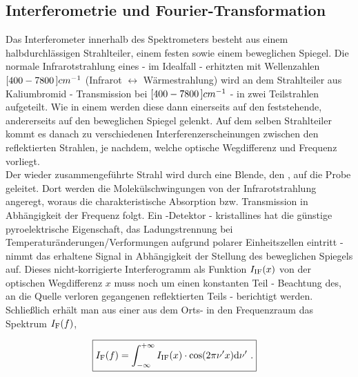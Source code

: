 \subsection{Interferometrie und Fourier-Transformation}

Das Interferometer innerhalb des Spektrometers besteht aus einem halbdurchl\"assigen Strahlteiler, einem festen sowie einem beweglichen Spiegel. Die normale Infrarotstrahlung eines - im Idealfall - erhitzten  mit Wellenzahlen $\unit[[400-7800]]{cm^{-1}}$ (Infrarot $\leftrightarrow$ W\"armestrahlung) wird an dem Strahlteiler aus Kaliumbromid - Transmission bei $\unit[[400-7800]]{cm^{-1}}$ - in zwei Teilstrahlen aufgeteilt. Wie in einem  werden diese dann einerseits auf den feststehende, andererseits auf den beweglichen Spiegel gelenkt. Auf dem selben Strahlteiler kommt es danach zu verschiedenen Interferenzerscheinungen zwischen den reflektierten Strahlen, je nachdem, welche optische Wegdifferenz und Frequenz vorliegt.\\
Der wieder zusammengef\"uhrte Strahl wird durch eine Blende, den , auf die Probe geleitet. Dort werden die Molek\"ulschwingungen von der Infrarotstrahlung angeregt, woraus die charakteristische Absorption bzw. Transmission in Abh\"angigkeit der Frequenz folgt. Ein -Detektor - kristallines  hat die g\"unstige pyroelektrische Eigenschaft, das Ladungstrennung bei Temperatur\"anderungen/Verformungen aufgrund polarer Einheitszellen eintritt - nimmt das erhaltene Signal in Abh\"angigkeit der Stellung des beweglichen Spiegels auf. Dieses nicht-korrigierte Interferogramm als Funktion $I_\text{IF}(x)$ von der optischen Wegdifferenz $x$ muss noch um einen konstanten Teil - Beachtung des, an die Quelle verloren gegangenen reflektierten Teils - berichtigt werden. Schlie{\ss}lich erh\"alt man aus einer   aus dem Orts- in den Frequenzraum das Spektrum $I_\text{F}(f)$,

\begin{align}
\Aboxed{
	I\ix{F}(f)=\int_{-\infty}^{+\infty}I\ix{IF}(x)\cdot\cos(2\pi\nu^{\prime}x)\diff \nu^{\prime}\,\, .
}
\label{eq:fourier}
\end{align}

